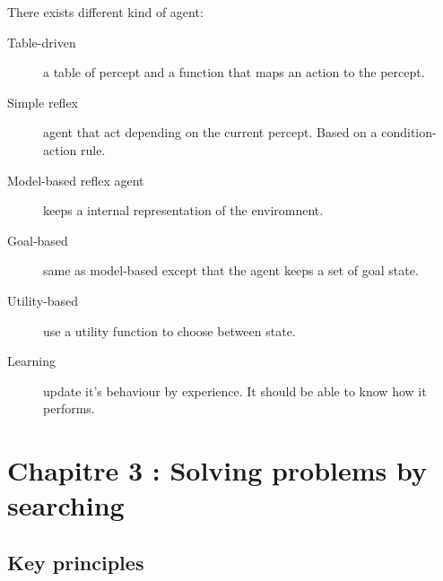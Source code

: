 There exists different kind of agent:
\begin{description}
\item[Table-driven] a table of percept and a function that maps an action to the percept.
\item[Simple reflex] agent that act depending on the current percept. Based on a condition-action 
rule.
\item[Model-based reflex agent] keeps a internal representation of the enviromnent.
\item[Goal-based] same as model-based except that the agent keeps a set of goal state.
\item[Utility-based] use a utility function to choose between state.
\item[Learning] update it's behaviour by experience. It should be able to know how it performs. 
\end{description}
\section{Chapitre 3 : Solving problems by searching}

\subsection{Key principles}

